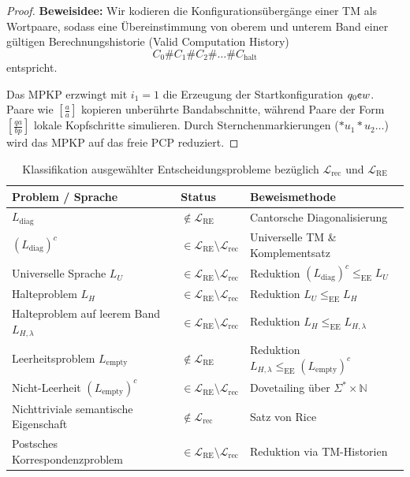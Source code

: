 \begin{proof}
    \textbf{Beweisidee:} Wir kodieren die Konfigurationsübergänge einer TM als Wortpaare, sodass eine Übereinstimmung von oberem und unterem Band einer gültigen Berechnungshistorie (Valid Computation History)
    \[
        C_0 \# C_1 \# C_2 \# \dots \# C_{\mathrm{halt}}
    \]
    entspricht.
    
    Das MPKP erzwingt mit $i_1 = 1$ die Erzeugung der Startkonfiguration $q_0 \text{\textcent} w$. Paare wie $[\frac{a}{a}]$ kopieren unberührte Bandabschnitte, während Paare der Form $[\frac{q a}{b p}]$ lokale Kopfschritte simulieren. Durch Sternchenmarkierungen ($* u_1 * u_2 \dots$) wird das MPKP auf das freie PCP reduziert.
\end{proof}

\begin{table}[htbp]
    \centering
    \small
    \caption{Klassifikation ausgewählter Entscheidungsprobleme bezüglich $\mathcal{L}_{\mathrm{rec}}$ und $\mathcal{L}_{\mathrm{RE}}$}
    \label{tab:unentscheidbarkeit}
    \vspace{0.5em}
    \begin{tabular}{p{5.5cm}ll}
        \toprule
        \textbf{Problem / Sprache} & \textbf{Status} & \textbf{Beweismethode} \\
        \midrule
        $L_{\mathrm{diag}}$ & $\notin \mathcal{L}_{\mathrm{RE}}$ & Cantorsche Diagonalisierung \\
        $(L_{\mathrm{diag}})^c$ & $\in \mathcal{L}_{\mathrm{RE}} \setminus \mathcal{L}_{\mathrm{rec}}$ & Universelle TM \& Komplementsatz \\
        Universelle Sprache $L_U$ & $\in \mathcal{L}_{\mathrm{RE}} \setminus \mathcal{L}_{\mathrm{rec}}$ & Reduktion $(L_{\mathrm{diag}})^c \le_{\mathrm{EE}} L_U$ \\
        Halteproblem $L_H$ & $\in \mathcal{L}_{\mathrm{RE}} \setminus \mathcal{L}_{\mathrm{rec}}$ & Reduktion $L_U \le_{\mathrm{EE}} L_H$ \\
        Halteproblem auf leerem Band $L_{H,\lambda}$ & $\in \mathcal{L}_{\mathrm{RE}} \setminus \mathcal{L}_{\mathrm{rec}}$ & Reduktion $L_H \le_{\mathrm{EE}} L_{H,\lambda}$ \\
        Leerheitsproblem $L_{\mathrm{empty}}$ & $\notin \mathcal{L}_{\mathrm{RE}}$ & Reduktion $L_{H,\lambda} \le_{\mathrm{EE}} (L_{\mathrm{empty}})^c$ \\
        Nicht-Leerheit $(L_{\mathrm{empty}})^c$ & $\in \mathcal{L}_{\mathrm{RE}} \setminus \mathcal{L}_{\mathrm{rec}}$ & Dovetailing über $\Sigma^* \times \mathbb{N}$ \\
        Nichttriviale semantische Eigenschaft & $\notin \mathcal{L}_{\mathrm{rec}}$ & Satz von Rice \\
        Postsches Korrespondenzproblem & $\in \mathcal{L}_{\mathrm{RE}} \setminus \mathcal{L}_{\mathrm{rec}}$ & Reduktion via TM-Historien \\
        \bottomrule
    \end{tabular}
\end{table}
